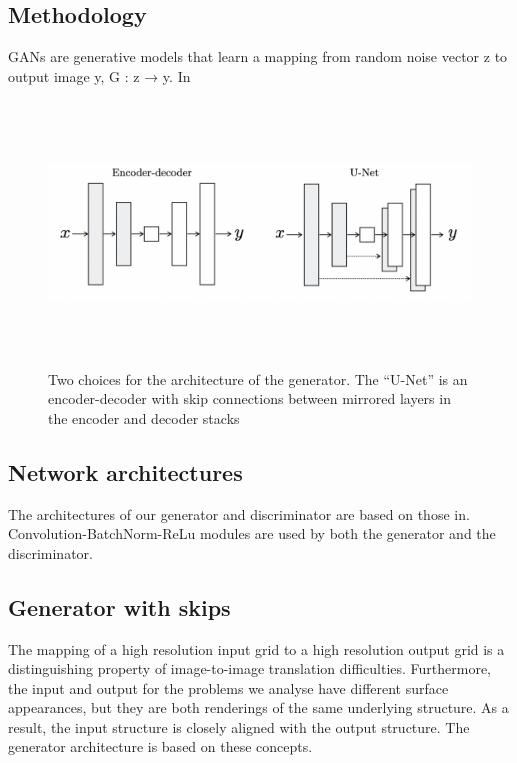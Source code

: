 \subsection{ Methodology}

GANs are generative models that learn a mapping from random noise vector z to output image y, G : z → y. In 

	\begin{figure}[h!]
     \centering
    \includegraphics[width=\linewidth,height=7cm]{figures/5.png}
    \caption{ Two choices for the architecture of the generator. The “U-Net” is an encoder-decoder with skip connections between mirrored layers in the encoder and decoder stacks }
    \label{fig:GAN model}

\end{figure}

\subsection{Network architectures}

The architectures of our generator and discriminator are based on those in. Convolution-BatchNorm-ReLu modules are used by both the generator and the discriminator.

\subsection{Generator with skips}

The mapping of a high resolution input grid to a high resolution output grid is a distinguishing property of image-to-image translation difficulties. Furthermore, the input and output for the problems we analyse have different surface appearances, but they are both renderings of the same underlying structure. As a result, the input structure is closely aligned with the output structure. The generator architecture is based on these concepts.

